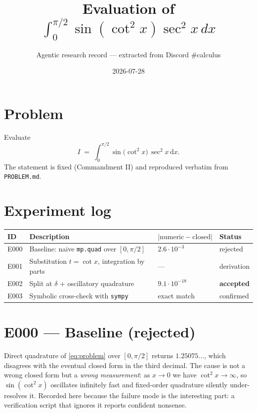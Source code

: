 \documentclass[11pt]{article}
\title{Evaluation of $\int_{0}^{\pi/2} \sin(\cot^{2}x)\sec^{2}x\,dx$}
\author{Agentic research record --- extracted from Discord \#calculus}
\date{2026-07-28}
\begin{document}
\maketitle

\section{Problem}

Evaluate
\begin{equation}\label{eq:problem}
  I \;=\; \int_{0}^{\pi/2} \sin\!\big(\cot^{2}x\big)\,\sec^{2}x\,\mathrm{d}x .
\end{equation}
The statement is fixed (Commandment II) and reproduced verbatim from
\texttt{PROBLEM.md}.

\section{Experiment log}

\begin{table}[h]
\centering
\begin{tabular}{llll}
\toprule
ID & Description & $|{\text{numeric}-\text{closed}}|$ & Status \\
\midrule
E000 & Baseline: naive \texttt{mp.quad} over $[0,\pi/2]$ & $2.6\cdot10^{-3}$ & rejected \\
E001 & Substitution $t=\cot x$, integration by parts & --- & derivation \\
E002 & Split at $\delta$ + oscillatory quadrature & $9.1\cdot10^{-18}$ & \textbf{accepted} \\
E003 & Symbolic cross-check with \texttt{sympy} & exact match & confirmed \\
\bottomrule
\end{tabular}
\end{table}

\section{E000 --- Baseline (rejected)}

Direct quadrature of \eqref{eq:problem} over $[0,\pi/2]$ returns $1.25075\ldots$,
which disagrees with the eventual closed form in the third decimal. The cause is
not a wrong closed form but a \emph{wrong measurement}: as $x\to0$ we have
$\cot^{2}x\to\infty$, so $\sin(\cot^{2}x)$ oscillates infinitely fast and
fixed-order quadrature silently under-resolves it. Recorded here because the
failure mode is the interesting part: a verification script that ignores it
reports confident nonsense.
\end{document}
